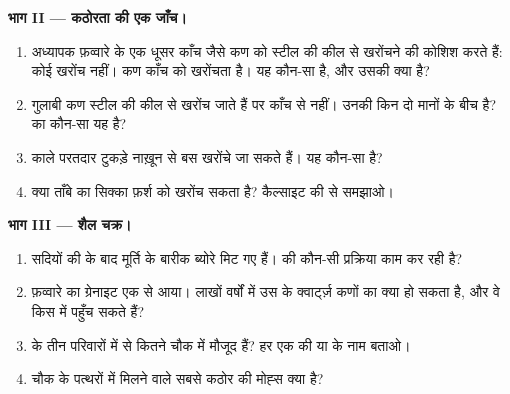 \begin{problem}
\medskip
\noindent\textbf{भाग II --- कठोरता की एक जाँच।}
\begin{enumerate}[resume]
  \item अध्यापक फ़व्वारे के एक धूसर काँच जैसे कण को स्टील की कील से खरोंचने की
        कोशिश करते हैं: कोई खरोंच नहीं। कण काँच को खरोंचता है। यह कौन-सा
         है, और उसकी  क्या है?
  \item गुलाबी कण स्टील की कील से खरोंच जाते हैं पर काँच से नहीं।
        उनकी  किन दो मानों के बीच है?  का कौन-सा 
        यह है?
  \item काले परतदार टुकड़े नाख़ून से बस खरोंचे जा सकते हैं। यह कौन-सा
         है?
  \item क्या ताँबे का सिक्का फ़र्श को खरोंच सकता है? कैल्साइट की  से
        समझाओ।
\end{enumerate}

\medskip
\noindent\textbf{भाग III --- शैल चक्र।}
\begin{enumerate}[resume]
  \item सदियों की  के बाद मूर्ति के बारीक ब्योरे मिट गए हैं।
         की कौन-सी प्रक्रिया काम कर रही है?
  \item फ़व्वारे का ग्रेनाइट एक  से आया। लाखों
        वर्षों में उस  के क्वार्ट्ज़ कणों का क्या हो सकता है,
        और वे किस  में पहुँच सकते हैं?
  \item {} के तीन परिवारों में से कितने चौक में मौजूद हैं?
        हर एक की  या  के नाम बताओ।
  \item चौक के पत्थरों में मिलने वाले सबसे कठोर  की मोह्स
         क्या है?
\end{enumerate}
\end{problem}
